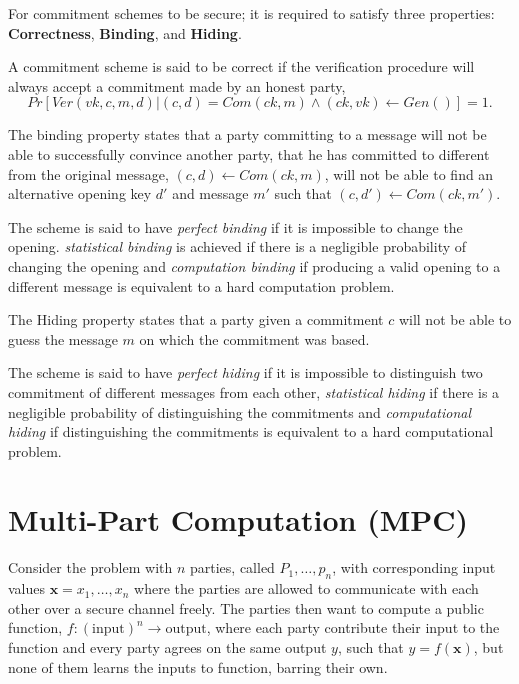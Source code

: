 For commitment schemes to be secure; it is required to satisfy three
properties: \textbf{Correctness}, \textbf{Binding}, and \textbf{Hiding}.

\begin{definition}
  A commitment scheme is said to be correct if
  the verification procedure  will always accept a commitment made by an honest party,
 \ie
$$
Pr[Ver(vk, c, m, d) | (c, d) = Com(ck, m) \land (ck, vk) \leftarrow Gen()] = 1.
$$
\end{definition}

\begin{definition}
The binding property states that a party committing to a message will not be
able to successfully convince another party, that he has committed to different
from the original message, \ie $(c, d) \leftarrow Com(ck, m)$, will not be able
to find an alternative opening key $d'$ and message $m'$ such that
$(c, d') \leftarrow Com(ck, m')$.

The scheme is said to have \textit{perfect binding} if it is impossible to change the
opening.
\textit{statistical binding} is achieved if there is a negligible probability of changing
the opening and \textit{computation binding} if producing a valid opening to a
different message is equivalent to a hard computation problem.
\end{definition}

\begin{definition}
The Hiding property states that a party given a commitment $c$ will not be able
to guess the message $m$ on which the commitment was based.

The scheme is said to have \textit{perfect hiding} if it is impossible to
distinguish two commitment of different messages from each other,
\textit{statistical hiding} if there is a negligible probability of
distinguishing the commitments and \textit{computational hiding} if
distinguishing the commitments is equivalent to a hard computational problem.
\end{definition}


\section{Multi-Part Computation (MPC)}
\label{sec:background:mpc}
Consider the problem with $n$ parties, called $P_{1}, \dots, p_{n}$, with
corresponding input values $\textbf{x} = x_{1}, \dots, x_{n}$ where the parties
are allowed to communicate with each other over a secure channel freely.
The parties then want to compute a public function,
$f : (\text{input})^{n} \rightarrow \text{output}$, where each party contribute
their input to the function and every party agrees on the same output
$y$, such that $y = f(\textbf{x})$, but none of them learns the inputs to
function, barring their own.

